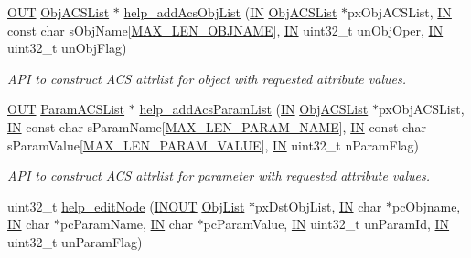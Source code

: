 \begin{DoxyCompactItemize}
\hyperlink{group__LIBHELP_gaec78e7a9e90a406a56f859ee456e8eae}{O\-U\-T} \hyperlink{structObjACSList}{Obj\-A\-C\-S\-List} $\ast$ \hyperlink{group__LIBHELP_gad48fc3ed404fdd0a11893f5eba682951}{help\-\_\-add\-Acs\-Obj\-List} (\hyperlink{group__LIBHELP_gac2bbd6d630a06a980d9a92ddb9a49928}{I\-N} \hyperlink{structObjACSList}{Obj\-A\-C\-S\-List} $\ast$px\-Obj\-A\-C\-S\-List, \hyperlink{group__LIBHELP_gac2bbd6d630a06a980d9a92ddb9a49928}{I\-N} const char s\-Obj\-Name\mbox{[}\hyperlink{group__LIBHELP_ga635a84c0e3ae6e922f824064a006500d}{M\-A\-X\-\_\-\-L\-E\-N\-\_\-\-O\-B\-J\-N\-A\-M\-E}\mbox{]}, \hyperlink{group__LIBHELP_gac2bbd6d630a06a980d9a92ddb9a49928}{I\-N} uint32\-\_\-t un\-Obj\-Oper, \hyperlink{group__LIBHELP_gac2bbd6d630a06a980d9a92ddb9a49928}{I\-N} uint32\-\_\-t un\-Obj\-Flag)
\begin{DoxyCompactList}\small\item\em A\-P\-I to construct A\-C\-S attrlist for object with requested attribute values. \end{DoxyCompactList}\item 
\hyperlink{group__LIBHELP_gaec78e7a9e90a406a56f859ee456e8eae}{O\-U\-T} \hyperlink{structParamACSList}{Param\-A\-C\-S\-List} $\ast$ \hyperlink{group__LIBHELP_gaeb06943c87068f172cd2c56bf85f3c2d}{help\-\_\-add\-Acs\-Param\-List} (\hyperlink{group__LIBHELP_gac2bbd6d630a06a980d9a92ddb9a49928}{I\-N} \hyperlink{structObjACSList}{Obj\-A\-C\-S\-List} $\ast$px\-Obj\-A\-C\-S\-List, \hyperlink{group__LIBHELP_gac2bbd6d630a06a980d9a92ddb9a49928}{I\-N} const char s\-Param\-Name\mbox{[}\hyperlink{group__LIBHELP_gaac5d922b6e3eb48b7ba829979fd73ae2}{M\-A\-X\-\_\-\-L\-E\-N\-\_\-\-P\-A\-R\-A\-M\-\_\-\-N\-A\-M\-E}\mbox{]}, \hyperlink{group__LIBHELP_gac2bbd6d630a06a980d9a92ddb9a49928}{I\-N} const char s\-Param\-Value\mbox{[}\hyperlink{group__LIBHELP_ga1b79b737d896845c1c07d942ffbfe3fa}{M\-A\-X\-\_\-\-L\-E\-N\-\_\-\-P\-A\-R\-A\-M\-\_\-\-V\-A\-L\-U\-E}\mbox{]}, \hyperlink{group__LIBHELP_gac2bbd6d630a06a980d9a92ddb9a49928}{I\-N} uint32\-\_\-t n\-Param\-Flag)
\begin{DoxyCompactList}\small\item\em A\-P\-I to construct A\-C\-S attrlist for parameter with requested attribute values. \end{DoxyCompactList}\item 
uint32\-\_\-t \hyperlink{group__LIBHELP_ga2973b4371e98489b03fbe021546cb9e1}{help\-\_\-edit\-Node} (\hyperlink{group__LIBHELP_ga62766f3ea8784d1db62df989f8f33d2d}{I\-N\-O\-U\-T} \hyperlink{structObjList}{Obj\-List} $\ast$px\-Dst\-Obj\-List, \hyperlink{group__LIBHELP_gac2bbd6d630a06a980d9a92ddb9a49928}{I\-N} char $\ast$pc\-Objname, \hyperlink{group__LIBHELP_gac2bbd6d630a06a980d9a92ddb9a49928}{I\-N} char $\ast$pc\-Param\-Name, \hyperlink{group__LIBHELP_gac2bbd6d630a06a980d9a92ddb9a49928}{I\-N} char $\ast$pc\-Param\-Value, \hyperlink{group__LIBHELP_gac2bbd6d630a06a980d9a92ddb9a49928}{I\-N} uint32\-\_\-t un\-Param\-Id, \hyperlink{group__LIBHELP_gac2bbd6d630a06a980d9a92ddb9a49928}{I\-N} uint32\-\_\-t un\-Param\-Flag)

\end{DoxyCompactItemize}
